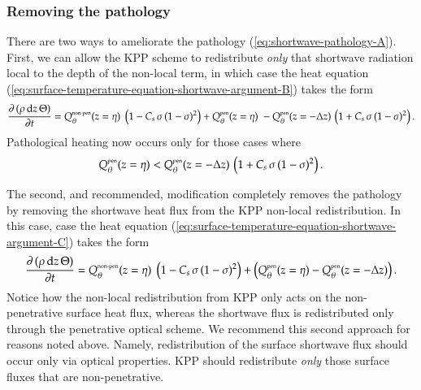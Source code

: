 \subsubsection{Removing the pathology}

There are two ways to ameliorate the pathology
(\ref{eq:shortwave-pathology-A}). First, we can allow the KPP scheme
to redistribute {\it only} that shortwave radiation local to the depth
of the non-local term, in which case the heat equation
(\ref{eq:surface-temperature-equation-shortwave-argument-B}) takes the
form
\begin{equation}
 \frac{\partial \, (\rho \, \mathrm{d}z \, \Theta)}{\partial t} 
 =     Q_{\theta}^{\mbox{\tiny non-pen}}(z=\eta) \;     \left( 1 - C_{s} \, \sigma \, (1-\sigma)^{2} \right) 
    +  Q_{\theta}^{\mbox{\tiny pen}}(z=\eta) \;     
    - Q_{\theta}^{\mbox{\tiny pen}}(z=-\Delta z) \, \left( 1 +  C_{s} \, \sigma \, (1-\sigma)^{2} \right). 
\label{eq:surface-temperature-equation-shortwave-argument-C} 
\end{equation}
Pathological heating now occurs only for those cases where 
\begin{equation}
 Q_{\theta}^{\mbox{\tiny pen}}(z=\eta)  <    Q_{\theta}^{\mbox{\tiny pen}}(z=-\Delta z)  
\, \left( 1 +  C_{s} \, \sigma \, (1-\sigma)^{2} \right).
\label{eq:shortwave-pathology-B}
\end{equation}

The second, and recommended, modification completely removes the
pathology by removing the shortwave heat flux from the KPP non-local
redistribution.  In this case, case the heat equation
(\ref{eq:surface-temperature-equation-shortwave-argument-C}) takes the
form
\begin{equation}
 \frac{\partial \, (\rho \, \mathrm{d}z \, \Theta)}{\partial t} 
 =     Q_{\theta}^{\mbox{\tiny non-pen}}(z=\eta) \;     \left( 1 - C_{s} \, \sigma \, (1-\sigma)^{2} \right) 
    +  \left( Q_{\theta}^{\mbox{\tiny pen}}(z=\eta) - Q_{\theta}^{\mbox{\tiny pen}}(z=-\Delta z) \right). 
\label{eq:surface-temperature-equation-shortwave-argument-D} 
\end{equation}
Notice how the non-local redistribution from KPP only acts on the
non-penetrative surface heat flux, whereas the shortwave flux is
redistributed only through the penetrative optical scheme.  We
recommend this second approach for reasons noted above.  Namely,
redistribution of the surface shortwave flux should occur only via
optical properties.  KPP should redistribute {\it only} those surface
fluxes that are non-penetrative.


